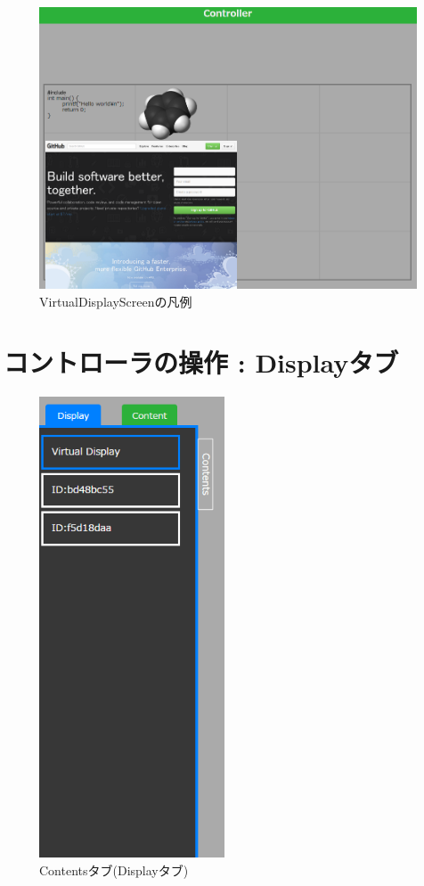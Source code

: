 \documentclass[a4paper,10pt,oneside]{jsbook}
\begin{document}
\begin{figure}[htbp]
	\begin{center}
		\includegraphics[width=15.5cm]{image/TDD_View.PNG}
	\end{center}
	\caption{VirtualDisplayScreenの凡例}
	\label{fig:vds}
\end{figure}

\newpage



\section{コントローラの操作 : Displayタブ}
\begin{figure}
	\begin{center}
		\includegraphics[width=5.5cm]{image/Display_TAB_2conn.PNG}
	\end{center}
	\caption{Contentsタブ(Displayタブ)}
	\label{fig:contentstab}
\end{figure}
\end{document}
